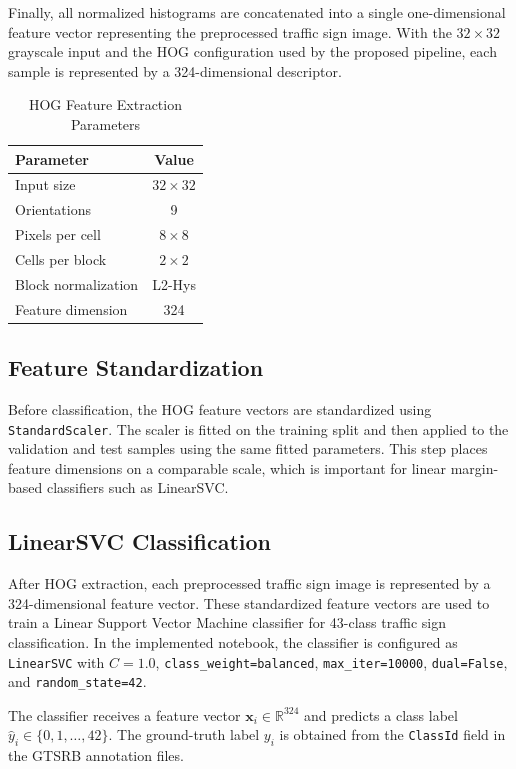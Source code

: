 \documentclass[conference]{IEEEtran}
\begin{document}
Finally, all normalized histograms are concatenated into a single one-dimensional feature vector representing the preprocessed traffic sign image. With the $32 \times 32$ grayscale input and the HOG configuration used by the proposed pipeline, each sample is represented by a 324-dimensional descriptor.

\begin{table}[htbp]
\caption{HOG Feature Extraction Parameters}
\label{tab:hog}
\centering
\begin{tabular}{lc}
\toprule
Parameter & Value\\
\midrule
Input size & $32 \times 32$\\
Orientations & 9\\
Pixels per cell & $8 \times 8$\\
Cells per block & $2 \times 2$\\
Block normalization & L2-Hys\\
Feature dimension & 324\\
\bottomrule
\end{tabular}
\end{table}

\subsection{Feature Standardization}

Before classification, the HOG feature vectors are standardized using \texttt{StandardScaler}. The scaler is fitted on the training split and then applied to the validation and test samples using the same fitted parameters. This step places feature dimensions on a comparable scale, which is important for linear margin-based classifiers such as LinearSVC.

\subsection{LinearSVC Classification}

After HOG extraction, each preprocessed traffic sign image is represented by a 324-dimensional feature vector. These standardized feature vectors are used to train a Linear Support Vector Machine classifier for 43-class traffic sign classification. In the implemented notebook, the classifier is configured as \texttt{LinearSVC} with $C=1.0$, \texttt{class\_weight=balanced}, \texttt{max\_iter=10000}, \texttt{dual=False}, and \texttt{random\_state=42}.

The classifier receives a feature vector $\mathbf{x}_i \in \mathbb{R}^{324}$ and predicts a class label $\hat{y}_i \in \{0,1,\ldots,42\}$. The ground-truth label $y_i$ is obtained from the \texttt{ClassId} field in the GTSRB annotation files.
\end{document}
